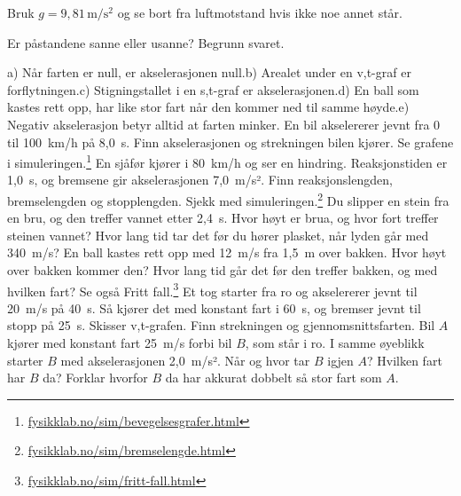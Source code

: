 \documentclass[11pt]{article}
\begin{document}
Bruk $g = 9{,}81\,\mathrm{m/s^{2}}$ og se bort fra luftmotstand hvis ikke noe annet står.

\begin{oppgaveliste}
\oppgave {}Er påstandene sanne eller usanne? Begrunn svaret.

a) Når farten er null, er akselerasjonen null.\newline b) Arealet under en v,t-graf er forflytningen.\newline c) Stigningstallet i en s,t-graf er akselerasjonen.\newline d) En ball som kastes rett opp, har like stor fart når den kommer ned til samme høyde.\newline e) Negativ akselerasjon betyr alltid at farten minker.
\svar
\oppgave {}En bil akselererer jevnt fra 0 til 100~km/h på 8,0~s. Finn akselerasjonen og strekningen bilen kjører. Se grafene i simuleringen.\footnote{\url{fysikklab.no/sim/bevegelsesgrafer.html}}
\svar
\oppgave {}En sjåfør kjører i 80~km/h og ser en hindring. Reaksjonstiden er 1,0~s, og bremsene gir akselerasjonen 7,0~m/s². Finn reaksjonslengden, bremselengden og stopplengden. Sjekk med simuleringen.\footnote{\url{fysikklab.no/sim/bremselengde.html}}
\svar
\oppgave {}Du slipper en stein fra en bru, og den treffer vannet etter 2,4~s. Hvor høyt er brua, og hvor fort treffer steinen vannet? Hvor lang tid tar det før du hører plasket, når lyden går med 340~m/s?
\svar
\oppgave {}En ball kastes rett opp med 12~m/s fra 1,5~m over bakken. Hvor høyt over bakken kommer den? Hvor lang tid går det før den treffer bakken, og med hvilken fart? Se også Fritt fall.\footnote{\url{fysikklab.no/sim/fritt-fall.html}}
\svar
\oppgave {}Et tog starter fra ro og akselererer jevnt til 20~m/s på 40~s. Så kjører det med konstant fart i 60~s, og bremser jevnt til stopp på 25~s. Skisser v,t-grafen. Finn strekningen og gjennomsnittsfarten.
\svar
\oppgave {}Bil $A$ kjører med konstant fart 25~m/s forbi bil $B$, som står i ro. I samme øyeblikk starter $B$ med akselerasjonen 2,0~m/s². Når og hvor tar $B$ igjen $A$? Hvilken fart har $B$ da? Forklar hvorfor $B$ da har akkurat dobbelt så stor fart som $A$.
\svar
\end{oppgaveliste}
\end{document}
